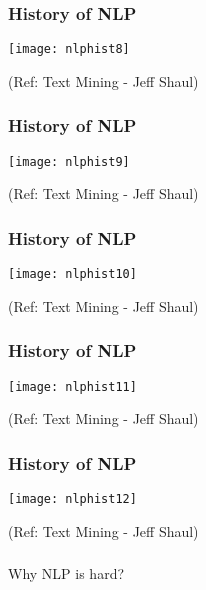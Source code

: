 \begin{frame}[fragile]\frametitle{History of NLP}
\begin{center}
\texttt{[image: nlphist8]}
\end{center}

{\tiny (Ref: Text Mining - Jeff Shaul)}
\end{frame}


\begin{frame}[fragile]\frametitle{History of NLP}
\begin{center}
\texttt{[image: nlphist9]}
\end{center}

{\tiny (Ref: Text Mining - Jeff Shaul)}
\end{frame}


\begin{frame}[fragile]\frametitle{History of NLP}
\begin{center}
\texttt{[image: nlphist10]}
\end{center}

{\tiny (Ref: Text Mining - Jeff Shaul)}
\end{frame}


\begin{frame}[fragile]\frametitle{History of NLP}
\begin{center}
\texttt{[image: nlphist11]}
\end{center}

{\tiny (Ref: Text Mining - Jeff Shaul)}
\end{frame}


\begin{frame}[fragile]\frametitle{History of NLP}
\begin{center}
\texttt{[image: nlphist12]}
\end{center}

{\tiny (Ref: Text Mining - Jeff Shaul)}
\end{frame}


\begin{frame}[fragile]\frametitle{}

\begin{center}
{\Large Why NLP is hard?}
\end{center}
\end{frame}

